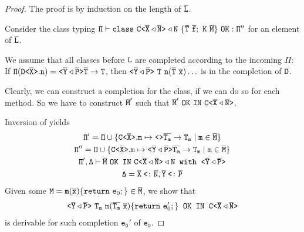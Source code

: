 \begin{proof}
  The proof is by induction on the length of $\overline{\tt L}$.

  Consider the class typing $\mathtt{ \Pi \vdash \texttt{class}\ \mathtt{C \texttt{<} \overline{\tt X} 
        \triangleleft \overline{\tt N} \texttt{>} } \triangleleft N\ \{ \overline{\tt T} \
      \overline{\tt f}; \ K \ \overline{\tt M} \} \ \texttt{OK} : \Pi''}$ for an element of $\overline{\tt L}$.

    We assume that all classes before ${\tt L}$ are completed according to the incoming $\mathtt{\Pi}$:
    If $\mathtt{\Pi (\mathtt{D \texttt{<} \overline{\tt X} \texttt{>} }.n)} = \mathtt{\mathtt{ \texttt{<} \overline{\tt Y} \triangleleft  \overline{\tt P} \texttt{>} }
      \overline{\tt T} \to T}$, then $\mathtt{\exptype{}{\ol{Y} \triangleleft  \ol{P}}\ T\ \mv{n}(\ol{T}\
      \ol{x}) \dots}$ is in the completion of ${\tt D}$.

    Clearly, we can construct a completion for the class, if we can do so for each method. So we
    have to construct $\overline{\tt M}'$ such that $\mathtt{\ol{M}'\ \mathtt{OK\ IN}\ \exptype{C}{\ol{X} 
        \triangleleft \ol{N}}}$. 

    Inversion of  yields
    \begin{gather}
      \label{eq:3}
      \mathtt{\Pi' = \Pi \cup \{ \mathtt{C \texttt{<} \overline{\tt X} \texttt{>} }.m \mapsto \mathtt{ \texttt{<}  \texttt{>} } \overline{\tt T_m} \to T_m \mid m \in \overline{\tt M} \} } \\
      \mathtt{\Pi'' = \Pi \cup \{ \mathtt{C \texttt{<} \overline{\tt X} \texttt{>} }.m \mapsto
          \mathtt{ \texttt{<} \overline{\tt Y} \triangleleft  \overline{\tt P} \texttt{>} } \overline{\tt T_m} \to T_m \mid m \in \overline{\tt M} \} } \\
      \label{eq:5}
      \mathtt{\Pi', \Delta \vdash \overline{\tt M} \ \texttt{OK IN}\
        \mathtt{C \texttt{<} \overline{\tt X} \triangleleft \overline{\tt N} \texttt{>} } \triangleleft N  \texttt{
          with } \mathtt{ \texttt{<} \overline{\tt Y} \triangleleft  \overline{\tt P} \texttt{>} }} \\
      \label{eq:7}
      \mathtt{\Delta = \overline{\tt X} \mathbin{\texttt{<:}}  \overline{\tt N}, \overline{\tt Y} \mathbin{\texttt{<:}}  \overline{\tt P}}
    \end{gather}
    Given some ${\tt M} = \texttt{m}(\overline{\tt \mathtt{x}}) \{\texttt{return}\ \mathtt{e}_0;\} \in \overline{\tt M}$,
    we show that
    \begin{gather}
      \label{eq:4}
      \exptype{}{\ol{Y} \triangleleft  \ol{P}}\ \mathtt{T_m}\ \texttt{m}(\ol{T_m}\ \ol{{x}})
      \{\texttt{return}\ \mathtt{e}'_0;\} \texttt{ OK IN }\exptype{C}{\ol{X} \triangleleft \ol{N}}
    \end{gather}
    is derivable for such completion $\mathtt{e_0'}$ of $\mathtt{e_0}$.


\end{proof}
